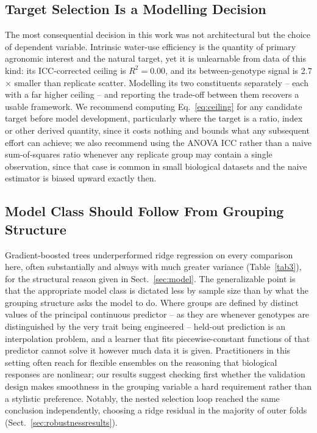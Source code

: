 \documentclass[runningheads]{llncs}
\begin{document}
\subsection{Target Selection Is a Modelling Decision}
The most consequential decision in this work was not architectural but the choice of dependent variable. Intrinsic water-use efficiency is the quantity of primary agronomic interest and the natural target, yet it is unlearnable from data of this kind: its ICC-corrected ceiling is $R^{2}=0.00$, and its between-genotype signal is 2.7$\times$ smaller than replicate scatter. Modelling its two constituents separately -- each with a far higher ceiling -- and reporting the trade-off between them recovers a usable framework. We recommend computing Eq.~\ref{eq:ceiling} for any candidate target before model development, particularly where the target is a ratio, index or other derived quantity, since it costs nothing and bounds what any subsequent effort can achieve; we also recommend using the ANOVA ICC rather than a naive sum-of-squares ratio whenever any replicate group may contain a single observation, since that case is common in small biological datasets and the naive estimator is biased upward exactly then.

\subsection{Model Class Should Follow From Grouping Structure}
Gradient-boosted trees underperformed ridge regression on every comparison here, often substantially and always with much greater variance (Table~\ref{tab3}), for the structural reason given in Sect.~\ref{sec:model}. The generalizable point is that the appropriate model class is dictated less by sample size than by what the grouping structure asks the model to do. Where groups are defined by distinct values of the principal continuous predictor -- as they are whenever genotypes are distinguished by the very trait being engineered -- held-out prediction is an interpolation problem, and a learner that fits piecewise-constant functions of that predictor cannot solve it however much data it is given. Practitioners in this setting often reach for flexible ensembles on the reasoning that biological responses are nonlinear; our results suggest checking first whether the validation design makes smoothness in the grouping variable a hard requirement rather than a stylistic preference. Notably, the nested selection loop reached the same conclusion independently, choosing a ridge residual in the majority of outer folds (Sect.~\ref{sec:robustnessresults}).
\end{document}
